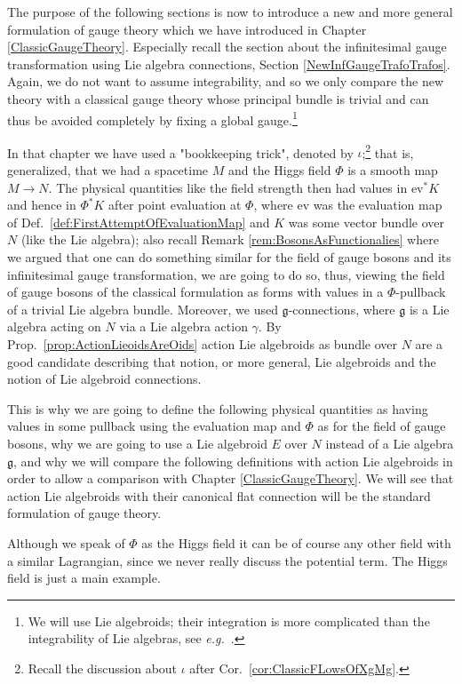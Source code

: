 The purpose of the following sections is now to introduce a new and more general formulation of gauge theory which we have introduced in Chapter \ref{ClassicGaugeTheory}. Especially recall the section about the infinitesimal gauge transformation using Lie algebra connections, Section \ref{NewInfGaugeTrafoTrafos}. Again, we do not want to assume integrability, and so we only compare the new theory with a classical gauge theory whose principal bundle is trivial and can thus be avoided completely by fixing a global gauge.\footnote{We will use Lie algebroids; their integration is more complicated than the integrability of Lie algebras, see \textit{e.g.}~\cite[\S 16.4; page 117]{DaSilva}.}

In that chapter we have used a "bookkeeping trick", denoted by $\iota$;\footnote{Recall the discussion about $\iota$ after Cor.~\ref{cor:ClassicFLowsOfXgMg}.} that is, generalized, that we had a spacetime $M$ and the Higgs field $\Phi$ is a smooth map $M \to N$. The physical quantities like the field strength then had values in $\mathrm{ev}^*K$ and hence in $\Phi^*K$ after point evaluation at $\Phi$, where $\mathrm{ev}$ was the evaluation map of Def.~\ref{def:FirstAttemptOfEvaluationMap} and $K$ was some vector bundle over $N$ (like the Lie algebra); also recall Remark \ref{rem:BosonsAsFunctionalies} where we argued that one can do something similar for the field of gauge bosons and its infinitesimal gauge transformation, we are going to do so, thus, viewing the field of gauge bosons of the classical formulation as forms with values in a $\Phi$-pullback of a trivial Lie algebra bundle. Moreover, we used $\mathfrak{g}$-connections, where $\mathfrak{g}$ is a Lie algebra acting on $N$ via a Lie algebra action $\gamma$. By Prop.~\ref{prop:ActionLieoidsAreOids} action Lie algebroids as bundle over $N$ are a good candidate describing that notion, or more general, Lie algebroids and the notion of Lie algebroid connections.

This is why we are going to define the following physical quantities as having values in some pullback using the evaluation map and $\Phi$ as for the field of gauge bosons, why we are going to use a Lie algebroid $E$ over $N$ instead of a Lie algebra $\mathfrak{g}$, and why we will compare the following definitions with action Lie algebroids in order to allow a comparison with Chapter \ref{ClassicGaugeTheory}. We will see that action Lie algebroids with their canonical flat connection will be the standard formulation of gauge theory.

Although we speak of $\Phi$ as the Higgs field it can be of course any other field with a similar Lagrangian, since we never really discuss the potential term. The Higgs field is just a main example.

